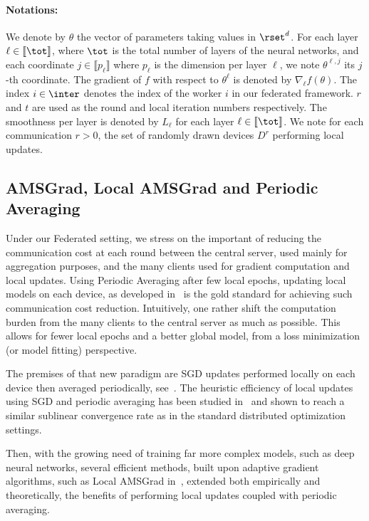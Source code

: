 \documentclass{article}
\begin{document}
\paragraph{Notations:} We denote by $\theta$ the vector of parameters taking values in $\rset^d$. 
For each layer $\ell \in \llbracket \tot \rrbracket$, where $\tot$ is the total number of layers of the neural networks, and each coordinate $j \in \llbracket p_\ell \rrbracket$ where $p_\ell$ is the dimension per layer $\ell$, we note $\theta^{\ell, j}$ its $j$-th coordinate.
The gradient of $f$ with respect to $\theta^\ell$ is denoted by $\nabla_{\ell} f(\theta)$.
The index $i \in \inter$ denotes the index of the worker $i$ in our federated framework.
$r$ and $t$ are used as the round and local iteration numbers respectively.
The smoothness per layer is denoted by $L_\ell$ for each layer $\ell \in \llbracket \tot \rrbracket$.
We note for each communication $r>0$, the set of randomly drawn devices $D^{r}$ performing local updates.


\subsection{AMSGrad, Local AMSGrad and Periodic Averaging}
Under our Federated setting, we stress on the important of reducing the communication cost at each round between the central server, used mainly for aggregation purposes, and the many clients used for gradient computation and local updates.
Using Periodic Averaging after few local epochs, updating local models on each device, as developed in~\citet{mcmahan2017communication} is the gold standard for achieving such communication cost reduction.
Intuitively, one rather shift the computation burden from the many clients to the central server as much as possible. This allows for fewer local epochs and a better global model, from a loss minimization (or model fitting) perspective.

The premises of that new paradigm are SGD updates performed locally on each device then averaged periodically, see~\citet{konevcny2016federated, zhou2017convergence}.
The heuristic efficiency of local updates using SGD and periodic averaging has been studied in~\citet{stich2018local,yu2019linear} and shown to reach a similar sublinear convergence rate as in the standard distributed optimization settings.

Then, with the growing need of training far more complex models, such as deep neural networks, several efficient methods, built upon adaptive gradient algorithms, such as Local AMSGrad in~\citet{chen2020toward}, extended both empirically and theoretically, the benefits of performing local updates coupled with periodic averaging.
\end{document}
